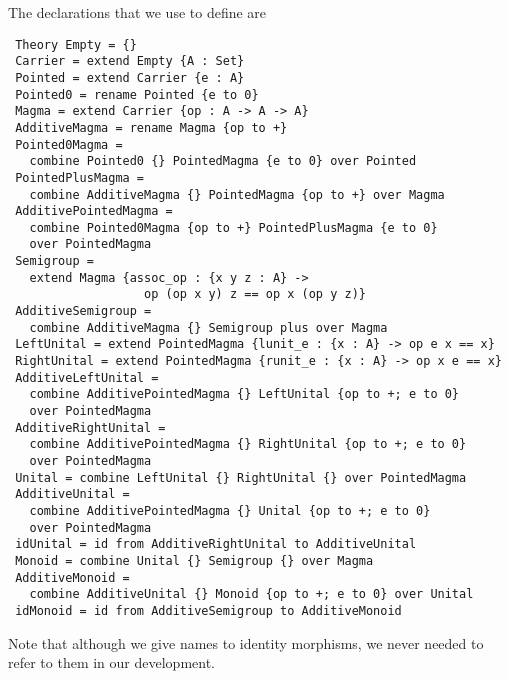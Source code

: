 The declarations that we use to define  are 
\begin{verbatim} 
 Theory Empty = {} 
 Carrier = extend Empty {A : Set}
 Pointed = extend Carrier {e : A}
 Pointed0 = rename Pointed {e to 0} 
 Magma = extend Carrier {op : A -> A -> A}
 AdditiveMagma = rename Magma {op to +} 
 Pointed0Magma = 
   combine Pointed0 {} PointedMagma {e to 0} over Pointed
 PointedPlusMagma = 
   combine AdditiveMagma {} PointedMagma {op to +} over Magma
 AdditivePointedMagma = 
   combine Pointed0Magma {op to +} PointedPlusMagma {e to 0} 
   over PointedMagma
 Semigroup = 
   extend Magma {assoc_op : {x y z : A} -> 
                   op (op x y) z == op x (op y z)}
 AdditiveSemigroup = 
   combine AdditiveMagma {} Semigroup plus over Magma
 LeftUnital = extend PointedMagma {lunit_e : {x : A} -> op e x == x}
 RightUnital = extend PointedMagma {runit_e : {x : A} -> op x e == x}
 AdditiveLeftUnital = 
   combine AdditivePointedMagma {} LeftUnital {op to +; e to 0} 
   over PointedMagma 
 AdditiveRightUnital = 
   combine AdditivePointedMagma {} RightUnital {op to +; e to 0} 
   over PointedMagma 
 Unital = combine LeftUnital {} RightUnital {} over PointedMagma
 AdditiveUnital = 
   combine AdditivePointedMagma {} Unital {op to +; e to 0} 
   over PointedMagma
 idUnital = id from AdditiveRightUnital to AdditiveUnital 
 Monoid = combine Unital {} Semigroup {} over Magma
 AdditiveMonoid = 
   combine AdditiveUnital {} Monoid {op to +; e to 0} over Unital 
 idMonoid = id from AdditiveSemigroup to AdditiveMonoid   
\end{verbatim} 
\noindent Note that although we give names to identity morphisms, we never needed to refer to them in our development. 

